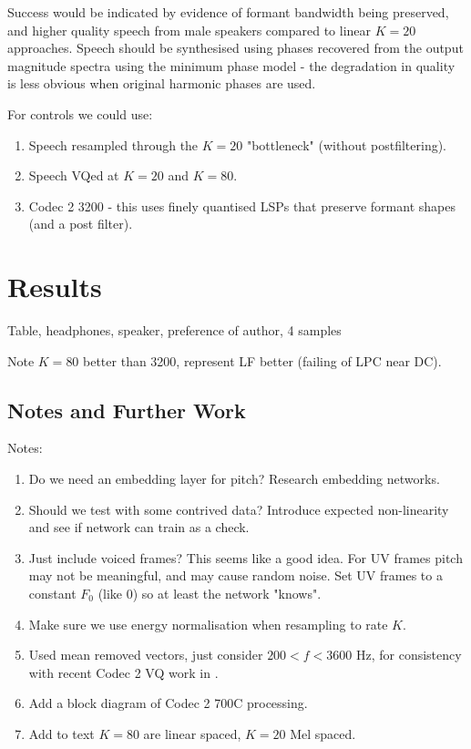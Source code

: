 \documentclass{article}
\begin{document}
Success would be indicated by evidence of formant bandwidth being preserved, and higher quality speech from male speakers compared to linear $K=20$ approaches. Speech should be synthesised using phases recovered from the output magnitude spectra using the minimum phase model - the degradation in quality is less obvious when original harmonic phases are used. 

For controls we could use:
\begin{enumerate}
\item Speech resampled through the $K=20$ "bottleneck" (without postfiltering).
\item Speech VQed at $K=20$ and $K=80$. 
\item Codec 2 3200 - this uses finely quantised LSPs that preserve formant shapes (and a post filter). 
\end{enumerate}

\section{Results}

Table, headphones, speaker, preference of author, 4 samples

Note $K=80$ better than 3200, represent LF better (failing of LPC near DC).

\subsection{Notes and Further Work}

Notes:
\begin{enumerate}
\item Do we need an embedding layer for pitch?  Research embedding networks.
\item Should we test with some contrived data?  Introduce expected non-linearity and see if network can train as a check.
\item Just include voiced frames?  This seems like a good idea.  For UV frames pitch may not be meaningful, and may cause random noise. Set UV frames to a constant $F_0$ (like 0) so at least the network "knows".
\item Make sure we use energy normalisation \cite{rowe2023_ratek_study} when resampling to rate $K$.
\item Used mean removed vectors, just consider $200 < f < 3600$ Hz, for consistency with recent Codec 2 VQ work in \cite{rowe2023_ratek_study}.
\item Add a block diagram of Codec 2 700C processing.
\item Add to text $K=80$ are linear spaced, $K=20$ Mel spaced.
\end{enumerate}
\end{document}
